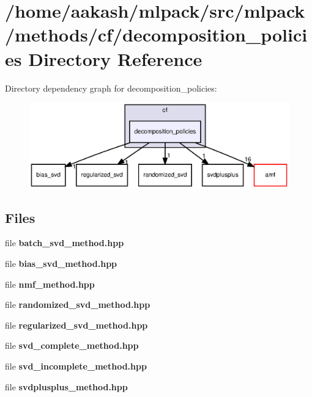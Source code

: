 \section{/home/aakash/mlpack/src/mlpack/methods/cf/decomposition\+\_\+policies Directory Reference}
\label{dir_73b596fb764cc00d4f57cba8cbfaad8d}
Directory dependency graph for decomposition\+\_\+policies\+:
\nopagebreak
\begin{figure}[H]
\begin{center}
\leavevmode
\includegraphics[width=350pt]{dir_73b596fb764cc00d4f57cba8cbfaad8d_dep}
\end{center}
\end{figure}
\subsection*{Files}
\begin{DoxyCompactItemize}
\item 
file \textbf{ batch\+\_\+svd\+\_\+method.\+hpp}
\item 
file \textbf{ bias\+\_\+svd\+\_\+method.\+hpp}
\item 
file \textbf{ nmf\+\_\+method.\+hpp}
\item 
file \textbf{ randomized\+\_\+svd\+\_\+method.\+hpp}
\item 
file \textbf{ regularized\+\_\+svd\+\_\+method.\+hpp}
\item 
file \textbf{ svd\+\_\+complete\+\_\+method.\+hpp}
\item 
file \textbf{ svd\+\_\+incomplete\+\_\+method.\+hpp}
\item 
file \textbf{ svdplusplus\+\_\+method.\+hpp}
\end{DoxyCompactItemize}
